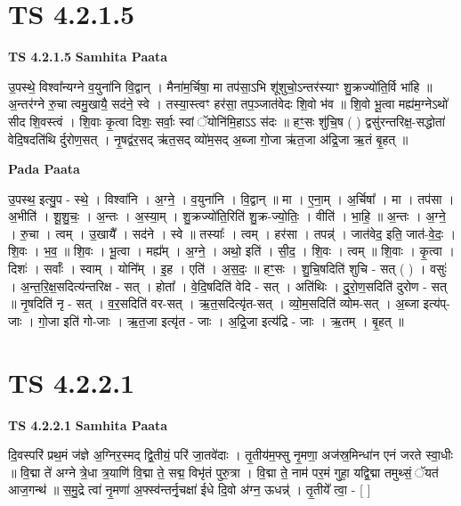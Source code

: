 \documentclass[17pt]{extarticle}
\begin{document}
\section{ TS 4.2.1.5 }

\textbf{TS 4.2.1.5 } \newline
\textbf{Samhita Paata} \newline

उ॒पस्थे॒ विश्वा᳚न्यग्ने व॒युना॑नि वि॒द्वान् । मैना॑म॒र्चिषा॒ मा तप॑सा॒ऽभि शू॑शुचो॒ऽन्तर॑स्याꣳ शु॒क्रज्यो॑ति॒र्वि भा॑हि ॥ अ॒न्तर॑ग्ने रु॒चा त्वमु॒खायै॒ सद॑ने॒ स्वे । तस्या॒स्त्वꣳ हर॑सा॒ तप॒ञ्जात॑वेदः शि॒वो भ॑व ॥ शि॒वो भू॒त्वा मह्य॑म॒ग्नेऽथो॑ सीद शि॒वस्त्वं । शि॒वाः कृ॒त्वा दिशः॒ सर्वाः॒ स्वां ॅयोनि॑मि॒हाऽऽ स॑दः ॥ हꣳ॒॒सः शु॑चि॒ष ( ) द्वसु॑रन्तरिक्ष॒-सद्धोता॑ वेदि॒षदति॑थि र्दुरोण॒सत् । नृ॒षद्व॑र॒सद् ऋ॑त॒सद् व्यो॑म॒सद् अ॒ब्जा गो॒जा ऋ॑त॒जा अ॑द्रि॒जा ऋ॒तं बृ॒हत् ॥ \newline

\textbf{Pada Paata} \newline

उ॒पस्थ॒ इत्यु॒प - स्थे॒ । विश्वा॑नि । अ॒ग्ने॒ । व॒युना॑नि । वि॒द्वान् ॥ मा । ए॒ना॒म् । अ॒र्चिषा᳚ । मा । तप॑सा । अ॒भीति॑ । शू॒शु॒चः॒ । अ॒न्तः । अ॒स्या॒म् । शु॒क्रज्यो॑ति॒रिति॑ शु॒क्र-ज्यो॒तिः॒ । वीति॑ । भा॒हि॒ ॥ अ॒न्तः । अ॒ग्ने॒ । रु॒चा । त्वम् । उ॒खायै᳚ । सद॑ने । स्वे ॥ तस्याः᳚ । त्वम् । हर॑सा । तपन्न्॑ । जात॑वेद॒ इति॒ जात॑-वे॒दः॒ । शि॒वः । भ॒व॒ ॥ शि॒वः । भू॒त्वा । मह्य᳚म् । अ॒ग्ने॒ । अथो॒ इति॑ । सी॒द॒ । शि॒वः । त्वम् ॥ शि॒वाः । कृ॒त्वा । दिशः॑ । सर्वाः᳚ । स्वाम् । योनि᳚म् । इ॒ह । एति॑ । अ॒स॒दः॒ ॥ हꣳ॒॒सः । शु॒चि॒षदिति॑ शुचि - सत् ( ) । वसुः॑ । अ॒न्त॒रि॒क्ष॒सदित्य॑न्तरिक्ष - सत् । होता᳚ । वे॒दि॒षदिति॑ वेदि - सत् । अति॑थिः । दु॒रो॒ण॒सदिति॑ दुरोण - सत् ॥ नृ॒षदिति॑ नृ - सत् । व॒र॒सदिति॑ वर-सत् । ऋ॒त॒सदित्यृ॑त-सत् । व्यो॒म॒सदिति॑ व्योम-सत् । अ॒ब्जा इत्य॑प्-जाः । गो॒जा इति॑ गो-जाः । ऋ॒त॒जा इत्यृ॑त - जाः । अ॒द्रि॒जा इत्य॑द्रि - जाः । ऋ॒तम् । बृ॒हत् ॥  \newline





\section{ TS 4.2.2.1 }

\textbf{TS 4.2.2.1 } \newline
\textbf{Samhita Paata} \newline

दि॒वस्परि॑ प्रथ॒मं ज॑ज्ञे अ॒ग्निर॒स्मद् द्वि॒तीयं॒ परि॑ जा॒तवे॑दाः । तृ॒तीय॑म॒फ्सु नृ॒मणा॒ अज॑स्र॒मिन्धा॑न एनं जरते स्वा॒धीः ॥ वि॒द्मा ते॑ अग्ने त्रे॒धा त्र॒याणि॑ वि॒द्मा ते॒ सद्म॒ विभृ॑तं पुरु॒त्रा । वि॒द्मा ते॒ नाम॑ पर॒मं गुहा॒ यद्वि॒द्मा तमुथ्सं॒ ॅयत॑ आज॒गन्थ॑ ॥ स॒मु॒द्रे त्वा॑ नृ॒मणा॑ अ॒फ्स्व॑न्तर्नृ॒चक्षा॑ ईधे दि॒वो अ॑ग्न॒ ऊधन्न्॑ । तृ॒तीये᳚ त्वा॒ - [  ] \newline
\end{document}

